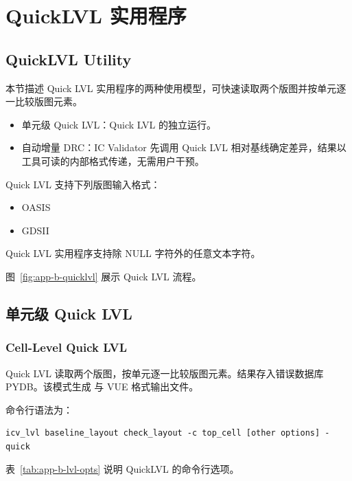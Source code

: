\section{QuickLVL 实用程序}
\subsection*{QuickLVL Utility}

本节描述 Quick LVL 实用程序的两种使用模型，可快速读取两个版图并按单元逐一比较版图元素。
\begin{itemize}
  \item 单元级 Quick LVL：Quick LVL 的独立运行。
  \item 自动增量 DRC：IC Validator 先调用 Quick LVL 相对基线确定差异，结果以工具可读的内部格式传递，无需用户干预。
\end{itemize}

Quick LVL 支持下列版图输入格式：
\begin{itemize}
  \item OASIS
  \item GDSII
\end{itemize}

\begin{noteBox}
Quick LVL 实用程序支持除 NULL 字符外的任意文本字符。
\end{noteBox}

图~\ref{fig:app-b-quicklvl} 展示 Quick LVL 流程。


\subsection{单元级 Quick LVL}
\subsubsection*{Cell-Level Quick LVL}

Quick LVL 读取两个版图，按单元逐一比较版图元素。结果存入错误数据库 PYDB。该模式生成  与 VUE 格式输出文件。

命令行语法为：

\begin{lstlisting}
icv_lvl baseline_layout check_layout -c top_cell [other options] -quick
\end{lstlisting}

表~\ref{tab:app-b-lvl-opts} 说明 QuickLVL 的命令行选项。

